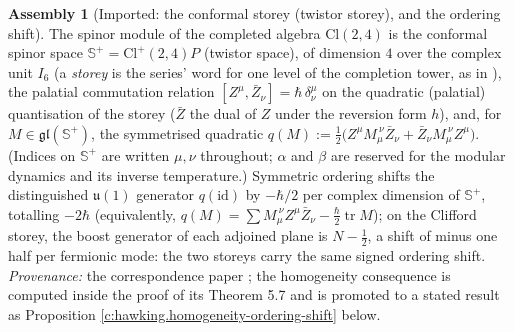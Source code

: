 \documentclass[11pt]{article}
\theoremstyle{definition}
\newtheorem{assembled}[theorem]{Assembly}
\theoremstyle{plain}
\newcommand{\changedmark}[2]{\marginpar{\raggedright\scriptsize\color{#1}#2}}
\providecommand{\CS}{}\renewcommand{\CS}{{\mathbb{S}^{+}}}
\providecommand{\Cl}{}\renewcommand{\Cl}{\mathrm{Cl}}
\providecommand{\id}{}\renewcommand{\id}{\mathrm{id}}
\providecommand{\tr}{}\renewcommand{\tr}{\operatorname{tr}}
\begin{document}
\begin{assembled}[Imported: the conformal storey (twistor storey), and the ordering shift]\label{c:hawking.imported-twistor-storey-ordering-shift}
\changedmark{gray}{reworded}
The spinor module of the completed algebra $\Cl(2,4)$ is the conformal spinor space $\CS = \Cl^+(2,4)P$ (twistor space), of dimension $4$ over the complex unit $I_6$ (a \emph{storey} is the series' word for one level of the completion tower, as in \cite{ButlerT9}), the palatial commutation relation $[Z^\mu, \bar Z_\nu] = \hbar\,\delta^\mu_\nu$ on the quadratic (palatial) quantisation of the storey ($\bar Z$ the dual of $Z$ under the reversion form $h$), and, for $M \in \mathfrak{gl}(\CS)$, the symmetrised quadratic $q(M) := \tfrac12\bigl(Z^\mu M_\mu^{\ \nu}\bar Z_\nu + \bar Z_\nu M_\mu^{\ \nu} Z^\mu\bigr)$. (Indices on $\CS$ are written $\mu, \nu$ throughout; $\alpha$ and $\beta$ are reserved for the modular dynamics and its inverse temperature.) Symmetric ordering shifts the distinguished $\mathfrak{u}(1)$ generator $q(\id)$ by $-\hbar/2$ per complex dimension of $\CS$, totalling $-2\hbar$ (equivalently, $q(M) = \sum M_\mu^{\ \nu} Z^\mu \bar Z_\nu - \tfrac{\hbar}{2}\tr M$); on the Clifford storey, the boost generator of each adjoined plane is $N - \tfrac12$, a shift of minus one half per fermionic mode: the two storeys carry the same signed ordering shift. \emph{Provenance:} the correspondence paper \cite[Thm.~3.1, Rem.~3.2, \S 5, Lem.~5.5, Prop.~5.6, Thm.~5.7]{ButlerT9}; the homogeneity consequence is computed inside the proof of its Theorem 5.7 and is promoted to a stated result as Proposition \ref{c:hawking.homogeneity-ordering-shift} below.
\end{assembled}
\end{document}
